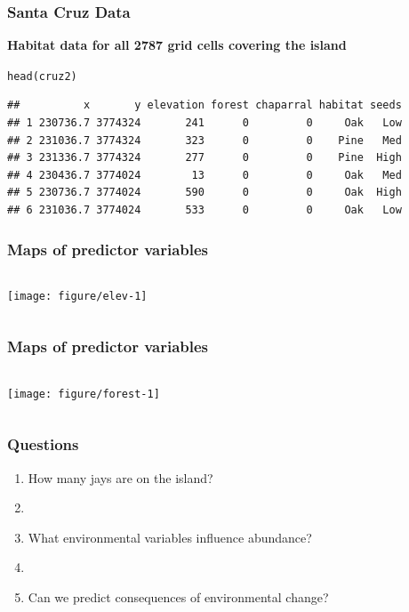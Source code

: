 \documentclass[color=usenames,dvipsnames]{beamer}\usepackage[]{graphicx}\usepackage[]{color}
\makeatletter
\newcommand{\hlstd}[1]{\textcolor[rgb]{0,0,0}{#1}}%
\newcommand{\hlkwd}[1]{\textcolor[rgb]{0.004,0.004,0.506}{#1}}%
\newenvironment{kframe}{%
 \def\at@end@of@kframe{}%
 \ifinner\ifhmode%
  \def\at@end@of@kframe{\end{minipage}}%
  \begin{minipage}{\columnwidth}%
 \fi\fi%
 \def\FrameCommand##1{\hskip\@totalleftmargin \hskip-\fboxsep
 \colorbox{shadecolor}{##1}\hskip-\fboxsep
     \hskip-\linewidth \hskip-\@totalleftmargin \hskip\columnwidth}%
 \MakeFramed {\advance\hsize-\width
   \@totalleftmargin\z@ \linewidth\hsize
   \@setminipage}}%
 {\par\unskip\endMakeFramed%
 \at@end@of@kframe}
\newenvironment{knitrout}{}{} %
\makeatother
\begin{document}
\begin{frame}[fragile]
  \frametitle{Santa Cruz Data}
  \footnotesize


{\bf Habitat data for all 2787 grid cells covering the island}
\begin{knitrout}
\color{fgcolor}\begin{kframe}
\begin{alltt}
\hlkwd{head}\hlstd{(cruz2)}
\end{alltt}
\begin{verbatim}
##          x       y elevation forest chaparral habitat seeds
## 1 230736.7 3774324       241      0         0     Oak   Low
## 2 231036.7 3774324       323      0         0    Pine   Med
## 3 231336.7 3774324       277      0         0    Pine  High
## 4 230436.7 3774024        13      0         0     Oak   Med
## 5 230736.7 3774024       590      0         0     Oak  High
## 6 231036.7 3774024       533      0         0     Oak   Low
\end{verbatim}
\end{kframe}
\end{knitrout}
\end{frame}



\begin{frame}[fragile]
  \frametitle{Maps of predictor variables}
  \scriptsize

\begin{columns}
  \column{\dimexpr\paperwidth-10pt}
  \texttt{[image: figure/elev-1]}
\end{columns}
\end{frame}




\begin{frame}[fragile]
  \frametitle{Maps of predictor variables}
  \scriptsize

\begin{columns}
  \column{\dimexpr\paperwidth-10pt}
  \texttt{[image: figure/forest-1]}
\end{columns}
\end{frame}






\begin{frame}
  \frametitle{Questions}
  \large
  \begin{enumerate}
    \item How many jays are on the island?
    \item[]
    \item What environmental variables influence abundance?
    \item[]
    \item Can we predict consequences of environmental change?
  \end{enumerate}
\end{frame}
\end{document}
